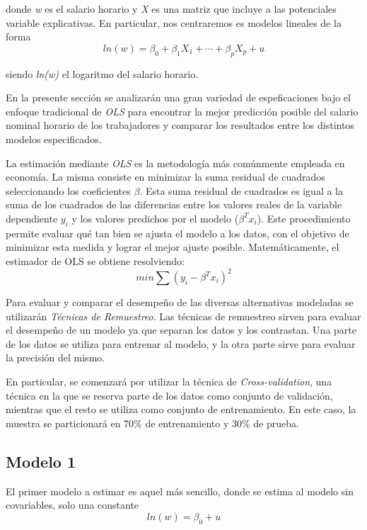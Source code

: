 \documentclass[11pt, a4paper]{article}
\begin{document}
donde \textit{w}  es el salario horario y \textit{X} es una matriz que incluye a las potenciales variable explicativas. En particular, nos centraremos es modelos lineales de la forma 
\begin{equation*}
ln(w)=\beta_0 + \beta_1 X_1 + \cdots + \beta_p X_p + u 
\end{equation*}

siendo \textit{ln(w)} el logaritmo del salario horario.


En la presente sección se analizarán una gran variedad de espeficaciones bajo el enfoque tradicional de \textit{OLS} para encontrar la mejor predicción posible del salario nominal horario de los trabajadores y comparar los resultados entre los distintos modelos especificados. 

La estimación mediante \textit{OLS} es la metodología más comúnmente empleada en economía. La misma consiste en minimizar la suma residual de cuadrados seleccionando los coeficientes $ \beta $. Esta suma residual de cuadrados es igual a la suma de los cuadrados de las diferencias entre los valores reales de la variable dependiente $y_i$ y los valores predichos por el modelo ($ \beta^{T}x_i $).  Este procedimiento permite evaluar qué tan bien se ajusta el modelo a los datos, con el objetivo de minimizar esta medida y lograr el mejor ajuste posible. Matemáticamente, el estimador de OLS se obtiene resolviendo:
\begin{equation*}
min\sum (y_i - \beta^{T}x_i)^2
\end{equation*}

Para evaluar y comparar el desempeño de las diversas alternativas modeladas se utilizarán \textit{Técnicas de Remuestreo}.  Las técnicas de remuestreo sirven para evaluar el desempeño de un modelo ya que separan los datos y los contrastan. Una parte de los datos se utiliza para entrenar al modelo, y la otra parte sirve para evaluar la precisión del mismo.  

En particular, se comenzará por utilizar la técnica de  \textit{Cross-validation}, una técnica en la que se reserva parte de los datos como conjunto de validación, mientras que el resto se utiliza como conjunto de entrenamiento. En este caso, la muestra se particionará en 70\% de entrenamiento y 30\% de prueba. 


\subsection{Modelo 1}

El primer modelo a estimar es aquel más sencillo, donde se estima al modelo sin covariables, solo una constante
\begin{equation*}
ln(w)=\beta_0 + u 
\end{equation*}
\end{document}
